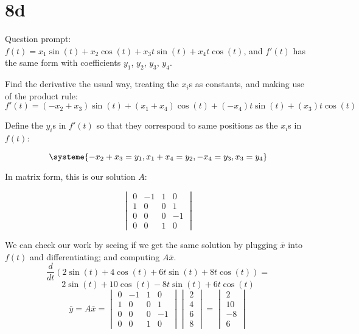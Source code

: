 \documentclass[12pt]{article}
\begin{document}
\section{8d}
Question prompt: $f(t) = x_1\sin(t) + x_2\cos(t) + x_3t\sin(t) + x_4t\cos(t)$,
and $f'(t)$ has the same form with coefficients $y_1$, $y_2$, $y_3$, $y_4$.

Find the derivative the usual way, treating the $x_i$s as constants, and making use of the product
rule: \\

\begin{equation}
f'(t) = (-x_2 + x_3)\sin(t) + (x_1 + x_4)\cos(t) + (-x_4)t\sin(t) + (x_3)t\cos(t)
\end{equation}

Define the $y_i$s in $f'(t)$ so that they correspond to same positions as the $x_i$s in $f(t)$:

\[
\systeme{-x_2 + x_3 = y_1, x_1 + x_4 = y_2, -x_4 = y_3,x_3 = y_4}
\]

In matrix form, this is our solution $A$:

\[
\begin{vmatrix}
  0 & -1 & 1 & 0 \\
  1 & 0 & 0 & 1 \\
  0 & 0 & 0 & -1 \\
  0 & 0 & 1 & 0 
\end{vmatrix}
\]

We can check our work by seeing if we get the same solution by plugging
$\bar{x}$ into $f(t)$ and differentiating; and computing $A\bar{x}$. 
\[
  \frac{d}{dt}(2\sin(t)+4\cos(t)+6t\sin(t)+8t\cos(t)) = 
\]
\[
  2\sin(t)+10\cos(t)-8t\sin(t)+6t\cos(t)
\]
\bigbreak{}
\[
  \bar{y} = A\bar{x} = 
  \begin{vmatrix}
    0 & -1 & 1 & 0 \\
    1 & 0 & 0 & 1 \\
    0 & 0 & 0 & -1 \\
    0 & 0 & 1 & 0 
    \end{vmatrix}
  \begin{vmatrix} 2 \\ 4 \\ 6 \\ 8\end{vmatrix} = 
  \begin{vmatrix} 2 \\ 10 \\ -8 \\ 6 \end{vmatrix}
\]
\end{document}
